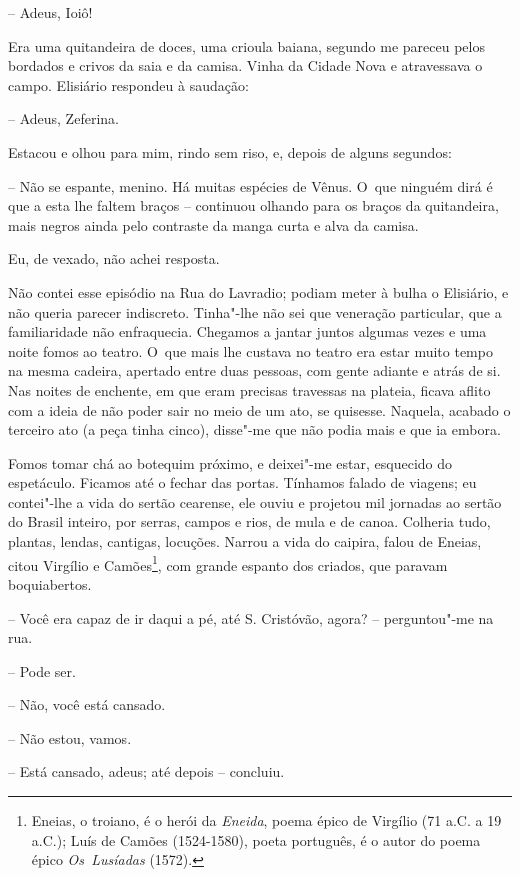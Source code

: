 -- Adeus, Ioiô!

Era uma quitandeira de doces, uma crioula baiana, segundo me pareceu
pelos bordados e crivos da saia e da camisa. Vinha da Cidade Nova e
atravessava o campo. Elisiário respondeu à saudação:

-- Adeus, Zeferina.

Estacou e olhou para mim, rindo sem riso, e, depois de alguns segundos:

-- Não se espante, menino. Há muitas espécies de Vênus. O~que ninguém
dirá é que a esta lhe faltem braços -- continuou olhando para os braços
da quitandeira, mais negros ainda pelo contraste da manga curta e alva
da camisa.

Eu, de vexado, não achei resposta.

Não contei esse episódio na Rua do Lavradio; podiam meter à bulha o
Elisiário, e não queria parecer indiscreto. Tinha"-lhe não sei que
veneração particular, que a familiaridade não enfraquecia. Chegamos a
jantar juntos algumas vezes e uma noite fomos ao teatro. O~que mais lhe
custava no teatro era estar muito tempo na mesma cadeira, apertado entre
duas pessoas, com gente adiante e atrás de si. Nas noites de enchente,
em que eram precisas travessas na plateia, ficava aflito com a ideia de
não poder sair no meio de um ato, se quisesse. Naquela, acabado o
terceiro ato (a peça tinha cinco), disse"-me que não podia mais e que ia
embora.

Fomos tomar chá ao botequim próximo, e deixei"-me estar, esquecido do
espetáculo. Ficamos até o fechar das portas. Tínhamos falado de viagens;
eu contei"-lhe a vida do sertão cearense, ele ouviu e projetou mil
jornadas ao sertão do Brasil inteiro, por serras, campos e rios, de mula
e de canoa. Colheria tudo, plantas, lendas, cantigas, locuções. Narrou a
vida do caipira, falou de Eneias, citou Virgílio e Camões\footnote{Eneias,
  o troiano, é o herói da \emph{Eneida}, poema épico de Virgílio (71
  a.C. a 19 a.C.); Luís de Camões (1524-1580), poeta português, é o
  autor do poema épico \emph{Os~Lusíadas} (1572).}, com grande espanto
dos criados, que paravam boquiabertos.

-- Você era capaz de ir daqui a pé, até S. Cristóvão, agora? --
perguntou"-me na rua.

-- Pode ser.

-- Não, você está cansado.

-- Não estou, vamos.

-- Está cansado, adeus; até depois -- concluiu.

